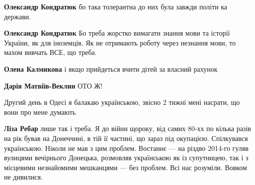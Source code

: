 \begin{itemize}
\begin{itemize}
\textbf{Олександр Кондратюк} бо така толерантна до них була завжди політи ка держави.

 
\textbf{Олександр Кондратюк} Бо треба жорстко вимагати знання мови та історії України, як для іноземців. Як не отримають роботу через незнання мови, то махом вивчать ВСЕ, що треба.

 
\textbf{Олена Калмикова} і якщо прийдеться вчити дітей за власний рахунок

 
\textbf{Дарія Матвіїв-Веклин} ОТО Ж!
\end{itemize}

 
Другий день в Одесі я балакаю українською, звісно 2 тижні мені насрати, що вони про мене думають

\begin{itemize}
 
\textbf{Ліза Ребар} лише так і треба. Я до війни щороку, від самих 80-хх по
кілька разів на рік бував на Донеччині, в тій її частині, що зараз під
окупацією. Спілкувався українською. Ніколи не мав з цим проблем. Востаннє — на
різдво 2014-го гуляв вулицями вечірнього Донецька, розмовляв українською як із
супутницею, так і з місцевими незнайомими мешканцями — без проблем. Всі нас
розуміли. Вовком не дивилися.


\end{itemize}
\end{itemize}

